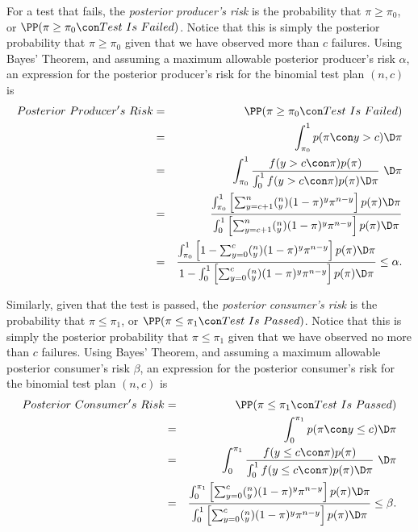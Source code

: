 \documentclass {book}
\begin{document}
For a test that fails, the \emph{posterior producer's
risk} is the probability
that $\pi\geq\pi_{0}$, or $\PP(\pi \ge \pi_0 \con Test\mbox{
}Is\mbox{ }Failed)$. Notice that this is simply the posterior
probability that $\pi \ge \pi_0$ given that we have observed more
than $c$ failures. Using Bayes' Theorem, and assuming a maximum
allowable posterior producer's risk $\alpha$, an expression for
the posterior producer's risk for the binomial test plan $(n,c)$ is
\begin{eqnarray}\label{ch10:eqn5}
Posterior\mbox{ }Producer's\mbox{ }Risk & = &
\PP(\pi \geq \pi_{0}\con Test\mbox{ }Is\mbox{ }Failed)\\
\mbox{} & = & \int_{\pi_0}^{1} p(\pi \con y > c) \D \pi \nonumber\\
\mbox{} & = & \int_{\pi_0}^{1} \frac{f(y > c \con \pi)
p(\pi)}{\int_{0}^{1} f(y > c \con \pi) p(\pi) \D \pi} \,\, \D \pi \nonumber\\
\mbox{} & = & \frac{\int_{\pi_0}^{1} \left[
\sum^{n}_{y=c+1}(_y^n)(1-\pi)^{y}\pi^{n-y} \right] p(\pi) \D
\pi}{\int_{0}^{1} \left[
\sum^{n}_{y=c+1}(_y^n)(1-\pi)^{y}\pi^{n-y} \right] p(\pi) \D
\pi}\nonumber\\ \mbox{} & = & \frac{\int_{\pi_0}^{1} \left[
1-\sum^{c}_{y=0}(_y^n)(1-\pi)^{y}\pi^{n-y} \right] p(\pi) \D
\pi}{1-\int_{0}^{1} \left[\sum^{c}_{y=0}(_y^n)(1-\pi)^{y}\pi^{n-y}
\right] p(\pi) \D \pi} \leq \alpha.\nonumber
\end{eqnarray}

Similarly, given that the test is passed, the \emph{posterior
consumer's risk} is the
probability that $\pi \leq \pi_1$, or $\PP(\pi \leq \pi_1 \con
Test\mbox{ }Is\mbox{ }Passed)$. Notice that this is simply the
posterior probability that $\pi \leq \pi_1$ given that we have
observed no more than $c$ failures. Using Bayes' Theorem, and
assuming a maximum allowable posterior consumer's risk $\beta$, an
expression for the posterior consumer's
risk for the binomial test
plan $(n,c)$ is
\begin{eqnarray}\label{ch10:eqn6}
Posterior\mbox{ }Consumer's\mbox{ }Risk & = &
\PP(\pi \leq \pi_{1}\con Test\mbox{ }Is\mbox{ }Passed)\\
\mbox{} & = & \int_{0}^{\pi_1} p(\pi \con y \leq c) \D \pi \nonumber\\
\mbox{} & = & \int_{0}^{\pi_1} \frac{f(y \leq c \con \pi)
p(\pi)}{\int_{0}^{1} f(y \leq c \con \pi) p(\pi) \D \pi} \,\, \D \pi \nonumber\\
\mbox{} & = & \frac{\int_{0}^{\pi_1} \left[
\sum^{c}_{y=0}(_y^n)(1-\pi)^{y}\pi^{n-y} \right] p(\pi) \D
\pi}{\int_{0}^{1} \left[ \sum^{c}_{y=0}(_y^n)(1-\pi)^{y}\pi^{n-y}
\right] p(\pi) \D \pi}\leq \beta.\nonumber
\end{eqnarray}
\end{document}
